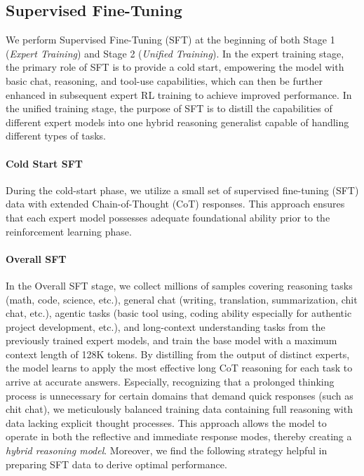 \documentclass{article}
\theoremstyle{definition}
\begin{document}
\subsection{Supervised Fine-Tuning}

We perform Supervised Fine-Tuning (SFT) at the beginning of both Stage 1 (\emph{Expert Training}) and Stage 2 (\emph{Unified Training}). In the expert training stage, the primary role of SFT is to provide a cold start, empowering the model with basic chat, reasoning, and tool-use capabilities, which can then be further enhanced in subsequent expert RL training to achieve improved performance. In the unified training stage, the purpose of SFT is to distill the capabilities of different expert models into one hybrid reasoning generalist capable of handling different types of tasks.

\paragraph{Cold Start SFT} During the cold-start phase, we utilize a small set of supervised fine-tuning (SFT) data with extended Chain-of-Thought (CoT) responses. This approach ensures that each expert model possesses adequate foundational ability prior to the reinforcement learning phase.

\paragraph{Overall SFT} In the Overall SFT stage, we collect millions of samples covering reasoning tasks (math, code, science, etc.), general chat (writing, translation, summarization, chit chat, etc.), agentic tasks (basic tool using, coding ability especially for authentic project development, etc.), and long-context understanding tasks from the previously trained expert models, and train the base model with a maximum context length of 128K tokens. By distilling from the output of distinct experts, the model learns to apply the most effective long CoT reasoning for each task to arrive at accurate answers. Especially, recognizing that a prolonged thinking process is unnecessary for certain domains that demand quick responses (such as chit chat), we meticulously balanced training data containing full reasoning with data lacking explicit thought processes. This approach allows the model to operate in both the reflective and immediate response modes, thereby creating a \emph{hybrid reasoning model}. Moreover, we find the following strategy helpful in preparing SFT data to derive optimal performance.
\end{document}
